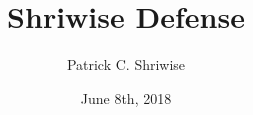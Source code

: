 \documentclass[9pt]{beamer}
\title{Shriwise Defense}
\author{Patrick C. Shriwise}
\date[06.08.2018]{June 8th, 2018}
\institute[UW - Madison]{University of Wisconsin - Madison}
\begin{document}
\frame{
  \titlepage
}
\end{document}
